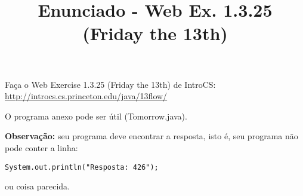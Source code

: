 \documentclass{article}
\title{Enunciado - Web Ex. 1.3.25 (Friday the 13th)}
\date{}
\author{}
\begin{document}
\maketitle

Fa\c{c}a o Web Exercise 1.3.25 (Friday the 13th) de IntroCS:
\bigbreak
\url{http://introcs.cs.princeton.edu/java/13flow/}
\bigbreak

O programa anexo pode ser \'util (Tomorrow.java).

\textbf{Observa\c{c}\~ao:} seu programa deve encontrar a resposta, isto \'e, seu programa n\~ao pode conter a linha:

\begin{verbatim}
System.out.println("Resposta: 426");
\end{verbatim}

ou coisa parecida.
\end{document}
